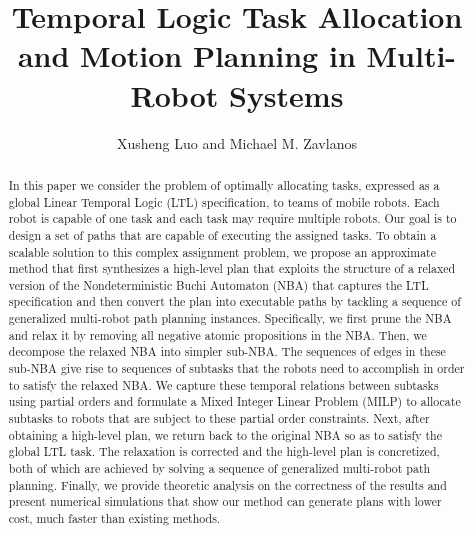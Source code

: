 \documentclass[Afour,sageh,times]{sagej}
\begin{document}

\author{Xusheng Luo and Michael M. Zavlanos}




\title{Temporal Logic Task Allocation and Motion Planning in Multi-Robot Systems}

\begin{abstract}
  In this paper we consider the problem of optimally allocating tasks, expressed as a global Linear Temporal Logic (LTL) specification, to teams of mobile robots. Each robot is capable of one task and each task may require multiple robots. Our goal is to design a set of  paths that are capable of executing the assigned tasks.
    To obtain a scalable solution to this complex assignment problem, we propose an approximate method that first synthesizes a high-level plan  that exploits the structure of a relaxed version of the Nondeterministic Buchi Automaton (NBA) that captures the LTL specification and then convert the plan into executable paths by tackling a sequence of generalized multi-robot path planning instances. Specifically, we first prune the NBA and relax it by removing all negative atomic propositions in the NBA. Then, we decompose the relaxed NBA into simpler sub-NBA. The sequences of edges in these sub-NBA give rise to sequences of subtasks that the robots need to accomplish in order to satisfy the relaxed NBA. We capture these temporal relations between subtasks using partial orders and formulate a Mixed Integer Linear Problem (MILP) to allocate subtasks to robots that are subject to these partial order constraints. Next, after obtaining a high-level plan, we return back to the original NBA so as to satisfy the global LTL task. The relaxation is corrected and the high-level plan is concretized, both of which are achieved by solving a sequence of generalized multi-robot path planning. Finally, we provide theoretic analysis on the correctness of the results and present numerical simulations that show our method can generate plans with lower cost, much faster than existing methods.
\end{abstract}

\maketitle
\end{document}
